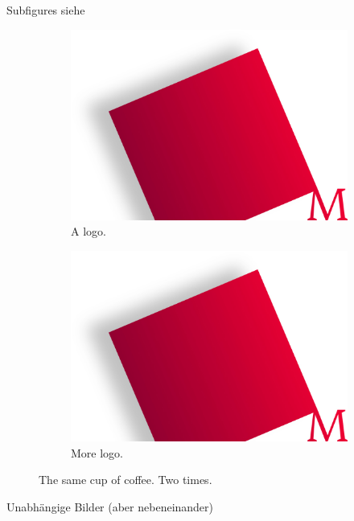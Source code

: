 \documentclass[\mainsize, a4paper, fleqn, xcolor=dvipsnames]{scrartcl}
\begin{document}
	Subfigures siehe 
	
	\begin{figure}[H]
  		\centering
  		\begin{subfigure}[b]{0.4\textwidth}
    		\includegraphics[width=\textwidth]{logo}
    		\caption{A logo.}
  		\end{subfigure}
  		\begin{subfigure}[b]{0.4\textwidth}
    		\includegraphics[width=\textwidth]{logo}
    		\caption{More logo.}
  		\end{subfigure}
  		\caption{The same cup of coffee. Two times.}
  		\label{fig:coffee}
	\end{figure}
	
	Unabhängige Bilder (aber nebeneinander)
	
\end{document}

